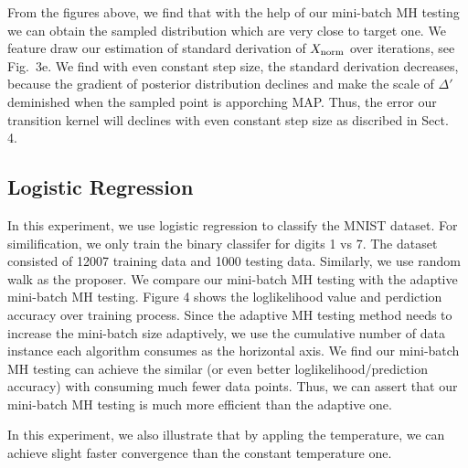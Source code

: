 \documentclass{article}
\begin{document}
From the figures above, we find that with the help of our mini-batch MH testing we can obtain the sampled distribution which are very close to target one. We feature draw our estimation of standard derivation of $X_{\rm norm}$ over iterations, see Fig.~3e. We find with even constant step size, the standard derivation decreases, because the gradient of posterior distribution declines and make the scale of $\Delta'$ deminished when the sampled point is apporching MAP. Thus, the error our transition kernel will declines with even constant step size as discribed in Sect.~ 4.
\subsection{Logistic Regression}\label{ssec:logistic}
In this experiment, we use logistic regression to classify the MNIST dataset. For similification, we only train the binary classifer for digits 1 vs 7. The dataset consisted of 12007 training data and 1000 testing data. Similarly, we use random walk as the proposer. We compare our mini-batch MH testing with the adaptive mini-batch MH testing. Figure 4 shows the loglikelihood value and perdiction accuracy over training process. Since the adaptive MH testing method needs to increase the mini-batch size adaptively, we use the cumulative number of data instance each algorithm consumes as the horizontal axis. We find our mini-batch MH testing can achieve the similar (or even better loglikelihood/prediction accuracy) with consuming much fewer data points. Thus, we can assert that our mini-batch MH testing is much more efficient than the adaptive one. 

In this experiment, we also illustrate that by appling the temperature, we can achieve slight faster convergence than the constant temperature one.
\end{document}

